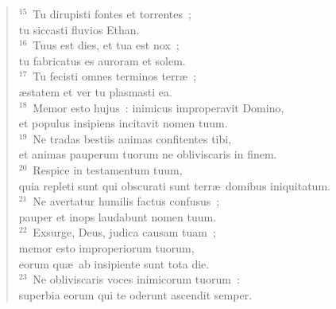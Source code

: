 \begin{verse}
${}^{15}$~Tu dirupisti fontes et torrentes~;\\ tu siccasti fluvios Ethan.\\
${}^{16}$~Tuus est dies, et tua est nox~;\\ tu fabricatus es auroram et solem.\\
${}^{17}$~Tu fecisti omnes terminos terr\ae~;\\ \ae statem et ver tu plasmasti ea.\\
${}^{18}$~Memor esto hujus~: inimicus improperavit Domino,\\ et populus insipiens incitavit nomen tuum.\\
${}^{19}$~Ne tradas bestiis animas confitentes tibi,\\ et animas pauperum tuorum ne obliviscaris in finem.\\
${}^{20}$~Respice in testamentum tuum,\\ quia repleti sunt qui obscurati sunt terr\ae\ domibus iniquitatum.\\
${}^{21}$~Ne avertatur humilis factus confusus~;\\ pauper et inops laudabunt nomen tuum.\\
${}^{22}$~Exsurge, Deus, judica causam tuam~;\\ memor esto improperiorum tuorum,\\ eorum qu\ae\ ab insipiente sunt tota die.\\
${}^{23}$~Ne obliviscaris voces inimicorum tuorum~:\\ superbia eorum qui te oderunt ascendit semper.\end{verse}



